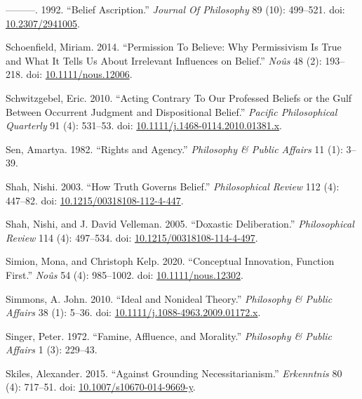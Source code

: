 \documentclass[
  10pt,
  letterpaper,
  DIV=11,
  numbers=noendperiod,
  twoside]{scrartcl}
\newlength{\cslhangindent}
\newenvironment{CSLReferences}[2] %
 {\begin{list}{}{%
  \setlength{\itemindent}{0pt}
  \setlength{\leftmargin}{0pt}
  \setlength{\parsep}{0pt}
  \ifodd #1
   \setlength{\leftmargin}{\cslhangindent}
   \setlength{\itemindent}{-1\cslhangindent}
  \fi
  \setlength{\itemsep}{#2\baselineskip}}}
 {\end{list}}
\begin{document}
\begin{CSLReferences}{1}{0}
---------. 1992. {``Belief Ascription.''} \emph{Journal Of Philosophy}
89 (10): 499--521. doi:
\href{https://doi.org/10.2307/2941005}{10.2307/2941005}.

Schoenfield, Miriam. 2014. {``Permission To Believe: Why Permissivism Is
True and What It Tells Us About Irrelevant Influences on Belief.''}
\emph{Noûs} 48 (2): 193--218. doi:
\href{https://doi.org/10.1111/nous.12006}{10.1111/nous.12006}.

Schwitzgebel, Eric. 2010. {``Acting Contrary To Our Professed Beliefs or
the Gulf Between Occurrent Judgment and Dispositional Belief.''}
\emph{Pacific Philosophical Quarterly} 91 (4): 531--53. doi:
\href{https://doi.org/10.1111/j.1468-0114.2010.01381.x}{10.1111/j.1468-0114.2010.01381.x}.

Sen, Amartya. 1982. {``Rights and Agency.''} \emph{Philosophy \& Public
Affairs} 11 (1): 3--39.

Shah, Nishi. 2003. {``How Truth Governs Belief.''} \emph{Philosophical
Review} 112 (4): 447--82. doi:
\href{https://doi.org/10.1215/00318108-112-4-447}{10.1215/00318108-112-4-447}.

Shah, Nishi, and J. David Velleman. 2005. {``Doxastic Deliberation.''}
\emph{Philosophical Review} 114 (4): 497--534. doi:
\href{https://doi.org/10.1215/00318108-114-4-497}{10.1215/00318108-114-4-497}.

Simion, Mona, and Christoph Kelp. 2020. {``Conceptual Innovation,
Function First.''} \emph{Noûs} 54 (4): 985--1002. doi:
\href{https://doi.org/10.1111/nous.12302}{10.1111/nous.12302}.

Simmons, A. John. 2010. {``Ideal and Nonideal Theory.''}
\emph{Philosophy \& Public Affairs} 38 (1): 5--36. doi:
\href{https://doi.org/10.1111/j.1088-4963.2009.01172.x}{10.1111/j.1088-4963.2009.01172.x}.

Singer, Peter. 1972. {``Famine, Affluence, and Morality.''}
\emph{Philosophy \& Public Affairs} 1 (3): 229--43.

Skiles, Alexander. 2015. {``Against Grounding Necessitarianism.''}
\emph{Erkenntnis} 80 (4): 717--51. doi:
\href{https://doi.org/10.1007/s10670-014-9669-y}{10.1007/s10670-014-9669-y}.


\end{CSLReferences}
\end{document}
